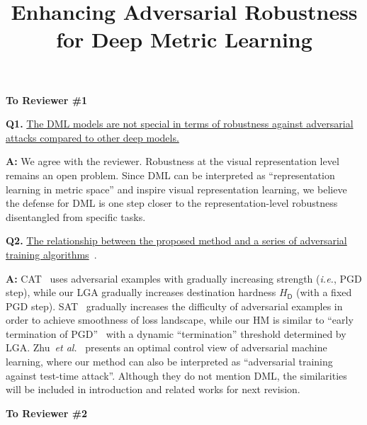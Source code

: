 \documentclass[10pt,twocolumn,letterpaper]{article}
\begin{document}
\title{Enhancing Adversarial Robustness for Deep Metric Learning}  %

\maketitle
\thispagestyle{empty}
\appendix

\noindent\textbf{To Reviewer \#1}
\vspace{0.3em}

\noindent\textbf{Q1.}
%
\ul{
The DML models are not special in terms of robustness against
adversarial attacks compared to other deep models.
}

\noindent\textbf{A:} 
%
We agree with the reviewer. Robustness at the visual representation level
remains an open problem. Since DML can be interpreted as ``representation
learning in metric space'' and inspire visual representation learning, we
believe the defense for DML is one step closer to the representation-level
robustness disentangled from specific tasks.

\noindent\textbf{Q2.}
%
\ul{
The relationship between the proposed method and a series of
adversarial training algorithms}~\cite{smoothat,currat,optcontrolaml}.

\noindent\textbf{A:}
%
CAT~\cite{currat} uses adversarial examples with gradually increasing strength
(\emph{i.e.}, PGD step), while our LGA gradually increases destination hardness
$H_\mathsf{D}$ (with a fixed PGD step).
%
SAT~\cite{smoothat} gradually increases the difficulty of adversarial examples
in order to achieve smoothness of loss landscape, while our HM is similar to
``early termination of PGD''~\cite{smoothat} with a dynamic ``termination''
threshold determined by LGA.
%
Zhu~\emph{et al.}~\cite{optcontrolaml} presents an optimal control view of
adversarial machine learning, where our method can also be interpreted as
``adversarial training against test-time attack''.
%
Although they do not mention DML, the similarities will be included in
introduction and related works for next revision.


\vspace{0.3em}
\noindent\textbf{To Reviewer \#2}\vspace{0.3em}
\end{document}

